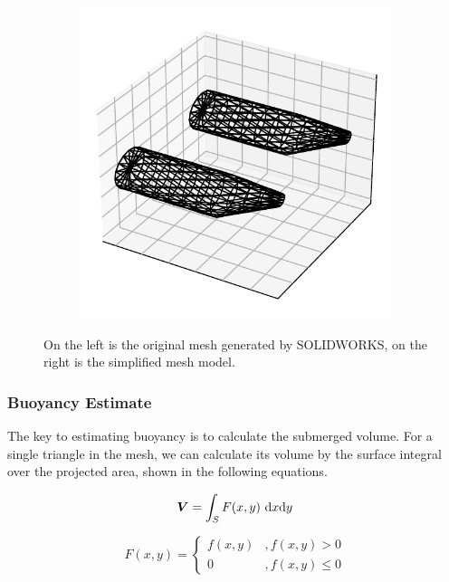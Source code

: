 \begin{figure}[H]
\begin{subfigure}[b]{0.4\textwidth}
         \includegraphics[width=\textwidth]{images/04mesh_orca.pdf}
     \end{subfigure}
     \caption{On the left is the original mesh generated by SOLIDWORKS, on the right is the simplified mesh model.}
     \label{fig:04mesh}
     \hspace{1cm}
\end{figure}

\subsubsection{Buoyancy Estimate}

The key to estimating buoyancy is to calculate the submerged volume. For a single triangle in the mesh, we can calculate its volume by the surface integral over the projected area, shown in the following equations.

\begin{equation}
    \boldsymbol{V} = \int_S F(x,y)\ {\rm d}x{\rm d}y
\end{equation}
   
\begin{equation}
    F(x,y)= \left\{\begin{aligned}
        f(x,y) &, f(x,y)>0 \\
        0 &, f(x,y)\leq 0
    \end{aligned}\right.
\end{equation} 

